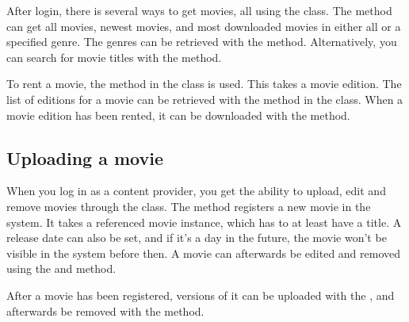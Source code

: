 After login, there is several ways to get movies, all using the  class. The  method can get all movies, newest movies, and most downloaded movies in either all or a specified genre. The genres can be retrieved with the  method. Alternatively, you can search for movie titles with the  method.

To rent a movie, the  method in the  class is used. This takes a movie edition. The list of editions for a movie can be retrieved with the  method in the  class. When a movie edition has been rented, it can be downloaded with the  method.

\subsection{Uploading a movie}
\label{Manual_Service_Usage_Upload}
When you log in as a content provider, you get the ability to upload, edit and remove movies through the  class. The  method registers a new movie in the system. It takes a referenced movie instance, which has to at least have a title. A release date can also be set, and if it's a day in the future, the movie won't be visible in the system before then. A movie can afterwards be edited and removed using the  and  method.

After a movie has been registered, versions of it can be uploaded with the , and afterwards be removed with the  method.
